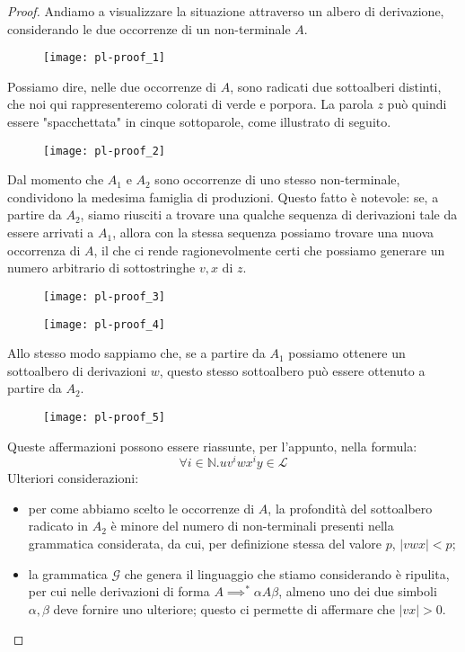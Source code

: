 \documentclass[class=book, crop=false, oneside, 12pt]{standalone}
\begin{document}
\begin{proof}
  Andiamo a visualizzare la situazione attraverso un albero di derivazione, considerando le due occorrenze di un non-terminale \(A\).
  \begin{figure}
    \centering
    \texttt{[image: pl-proof\_1]}
  \end{figure}
  Possiamo dire, nelle due occorrenze di \(A\), sono radicati due sottoalberi distinti, che noi qui rappresenteremo colorati di verde e porpora. La parola \(z\) può quindi essere "spacchettata" in cinque sottoparole, come illustrato di seguito.
  \begin{figure}
    \centering
    \texttt{[image: pl-proof\_2]}
  \end{figure}
  Dal momento che \(A_1\) e \(A_2\) sono occorrenze di uno stesso non-terminale, condividono la medesima famiglia di produzioni. Questo fatto è notevole: se, a partire da \(A_2\), siamo riusciti a trovare una qualche sequenza di derivazioni tale da essere arrivati a \(A_1\), allora con la stessa sequenza possiamo trovare una nuova occorrenza di \(A\), il che ci rende ragionevolmente certi che possiamo generare un numero arbitrario di sottostringhe \(v, x\) di \(z\).
  \begin{figure}[H]
    \centering
    \begin{minipage}{0.25\textwidth}
      \centering
      \texttt{[image: pl-proof\_3]}
    \end{minipage}
     \hfill
    \begin{minipage}{0.25\textwidth}
      \centering
      \texttt{[image: pl-proof\_4]}
    \end{minipage}
  \end{figure}
  Allo stesso modo sappiamo che, se a partire da \(A_1\) possiamo ottenere un sottoalbero di derivazioni \(w\), questo stesso sottoalbero può essere ottenuto a partire da \(A_2\).
  \begin{figure}
    \centering
    \texttt{[image: pl-proof\_5]}
  \end{figure}
  Queste affermazioni possono essere riassunte, per l'appunto, nella formula:
  \begin{equation*}
    \forall i \in \mathbb{N}.uv^iwx^iy \in \mathcal{L}
  \end{equation*}
  Ulteriori considerazioni:
   \begin{itemize}
     \item per come abbiamo scelto le occorrenze di \(A\), la profondità del sottoalbero radicato in \(A_2\) è minore del numero di non-terminali presenti nella grammatica considerata, da cui, per definizione stessa del valore \(p\), \(|vwx| < p\);
     \item la grammatica \(\mathcal{G}\) che genera il linguaggio che stiamo considerando è ripulita, per cui nelle derivazioni di forma \(A \implies^* \alpha A \beta\), almeno uno dei due simboli \(\alpha, \beta\) deve fornire uno ulteriore; questo ci permette di affermare che \(|vx| > 0\).
   \end{itemize}


\end{proof}
\end{document}
